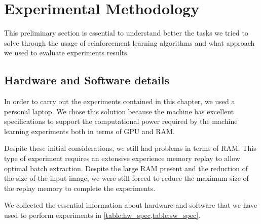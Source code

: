 \section{Experimental Methodology}

This preliminary section is essential to understand better the tasks we tried to solve through the usage of reinforcement learning algorithms and what approach we used to evaluate experiments results.

\subsection{Hardware and Software details}

In order to carry out the experiments contained in this chapter, we used a personal laptop.
We chose this solution because the machine has excellent specifications to support the computational power required by the machine learning experiments both in terms of GPU and RAM.

Despite these initial considerations, we still had problems in terms of RAM.
This type of experiment requires an extensive experience memory replay to allow optimal batch extraction.
Despite the large RAM present and the reduction of the size of the input image, we were still forced to reduce the maximum size of the replay memory to complete the experiments.

We collected the essential information about hardware and software that we have used to perform experiments in \vref{table:hw_spec,table:sw_spec}.

